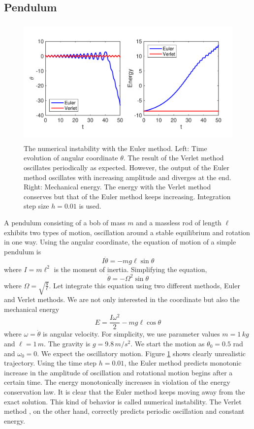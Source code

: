 \subsection{Pendulum}

\begin{figure}
\centerline{\includegraphics[height=2.5in]{05.ode1/pendulum_instability.pdf}}
\caption{The numerical instability with the Euler method.  Left: Time evolution of angular coordinate $\theta$. The result of the Verlet method oscillates periodically as expected. However, the output of the Euler method oscillates with increasing amplitude and diverges at the end. Right: Mechanical energy.  The energy with the Verlet method conserves but that of the Euler method keeps increasing. Integration step size $h=0.01$ is used.}
\label{fig:pendulum_instability}
\end{figure}

A pendulum consisting of a bob of mass $m$ and a massless rod of length $\ell$ exhibits two types of motion, oscillation around a stable equilibrium and rotation in one way.
Using the angular coordinate, the equation of motion of a simple pendulum is
\begin{equation}
I \ddot{\theta} = - m g \ell \sin \theta
\end{equation}
where $I=m \ell^2$ is the moment of inertia.  Simplifying the equation,
\begin{equation}
\ddot{\theta} = -\Omega^2 \sin \theta
\end{equation}
where $\Omega = \sqrt{\displaystyle\frac{g}{\ell}}$. Let integrate this equation using two different methods, Euler and Verlet methods.  We are not only interested in the coordinate but also the mechanical energy
\begin{equation}
E=\frac{I \omega^2}{2} - m g \ell \cos\theta
\end{equation}
where $\omega=\dot{\theta}$ is angular velocity.
For simplicity, we use parameter values $m=1\, kg$ and $\ell=1\, m$.  The gravity is $g=9.8\, m/s^2$.  We start the motion as
$\theta_0 = 0.5$ rad and $\omega_0=0$. We expect the oscillatory motion. Figure \ref{fig:pendulum_instability} shows clearly unrealistic trajectory. Using the time step $h=0.01$, the Euler method predicts monotonic increase in the amplitude of oscillation and rotational motion begins after a certain time. The energy monotonically increases in violation of the energy conservation law.  It is clear that the Euler method keeps moving away from the exact solution. This kind of behavior is called numerical instability. The Verlet method , on the other hand, correctly predicts periodic oscillation and constant energy.

